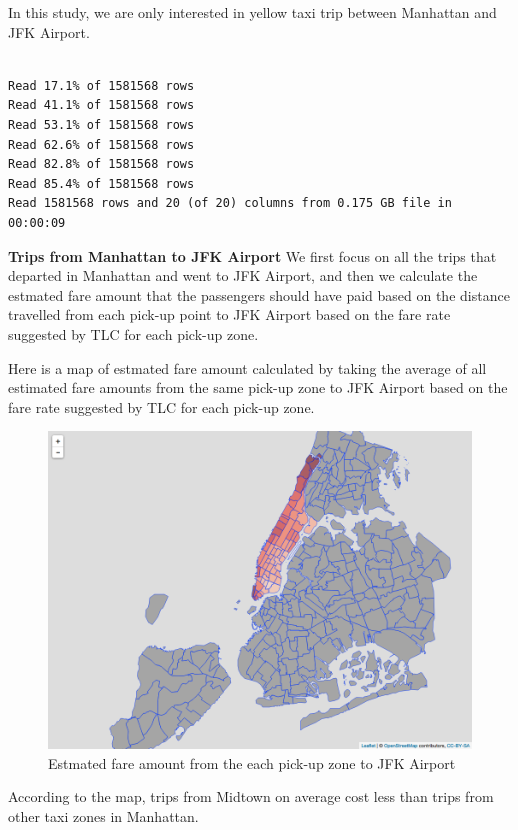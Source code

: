 \documentclass[12pt,twoside]{reedthesis}
\newenvironment{Shaded}{\begin{snugshade}}{\end{snugshade}}
\newcommand{\KeywordTok}[1]{\textcolor[rgb]{0.13,0.29,0.53}{\textbf{#1}}}
\newcommand{\DataTypeTok}[1]{\textcolor[rgb]{0.13,0.29,0.53}{#1}}
\newcommand{\DecValTok}[1]{\textcolor[rgb]{0.00,0.00,0.81}{#1}}
\newcommand{\StringTok}[1]{\textcolor[rgb]{0.31,0.60,0.02}{#1}}
\newcommand{\OtherTok}[1]{\textcolor[rgb]{0.56,0.35,0.01}{#1}}
\newcommand{\OperatorTok}[1]{\textcolor[rgb]{0.81,0.36,0.00}{\textbf{#1}}}
\newcommand{\NormalTok}[1]{#1}
\theoremstyle{definition}
\theoremstyle{definition}
\theoremstyle{definition}
\theoremstyle{remark}
\begin{document}
In this study, we are only interested in yellow taxi trip between
Manhattan and JFK Airport.
\begin{Shaded}
\end{Shaded}
\begin{verbatim}

Read 17.1% of 1581568 rows
Read 41.1% of 1581568 rows
Read 53.1% of 1581568 rows
Read 62.6% of 1581568 rows
Read 82.8% of 1581568 rows
Read 85.4% of 1581568 rows
Read 1581568 rows and 20 (of 20) columns from 0.175 GB file in 00:00:09
\end{verbatim}
\textbf{Trips from Manhattan to JFK Airport} We first focus on all the
trips that departed in Manhattan and went to JFK Airport, and then we
calculate the estmated fare amount that the passengers should have paid
based on the distance travelled from each pick-up point to JFK Airport
based on the fare rate suggested by TLC for each pick-up zone.

Here is a map of estmated fare amount calculated by taking the average
of all estimated fare amounts from the same pick-up zone to JFK Airport
based on the fare rate suggested by TLC for each pick-up zone.
\begin{figure}

{\centering \includegraphics[width=4.96in]{figure/to_jkf_fare_vis} 

}

\caption{Estmated fare amount from the each pick-up zone to JFK Airport}\label{fig:to-jkf-fare-vis}
\end{figure}
According to the map, trips from Midtown on average cost less than trips
from other taxi zones in Manhattan.
\end{document}
